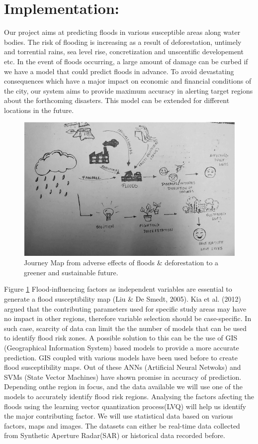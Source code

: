\documentclass{article}
\begin{document}
	\section*{Implementation:}
		Our project aims at predicting floods in various susceptible areas along water bodies. The risk of flooding is increasing as a result of deforestation, untimely and torrential rains, sea level rise, concretization and unscentific developement etc. In the event of floods occurring, a large amount of damage can be curbed if we have a model that could predict floods in advance. To avoid devastating consequences which have a major impact on economic and financial conditions of the city, our system aims to provide maximum accuracy in alerting target regions about the forthcoming disasters. This model can be extended for different locations in the future.
\begin{figure}
	\includegraphics[width=\linewidth]{journeymap.png}
	\caption{Journey Map from adverse effects of floods \& deforestation to a greener and sustainable future.}
	\label{fig:map}
\end{figure}

Figure \ref{fig:map}
Flood-influencing factors as independent variables are essential to generate a flood susceptibility map (Liu \& De Smedt, 2005). Kia et al. (2012) argued that the contributing parameters used for specific study areas may have no impact in other regions, therefore variable selection should be case-specific. In such case, scarcity of data can limit the the number of models that can be used to identify flood risk zones. A possible solution to this can be the use of GIS (Geographical Information System) based models to provide a more accurate prediction.  GIS coupled with various models have been used before to create flood susceptibility maps. Out of these ANNs (Artificial Neural Netwoks) and SVMs (State Vector Machines) have shown promise in accuracy of prediction. Depending onthe region in focus, and the data available we will use one of the models to accurately identify flood risk regions. Analysing the factors afecting the floods using the learning vector quantization process(LVQ) will help us identify the major contributing factor. 
We will use statistical data based on various factors, maps and images. The datasets can either be real-time data collected from Synthetic Aperture Radar(SAR) or historical data recorded before.   
\end{document}
